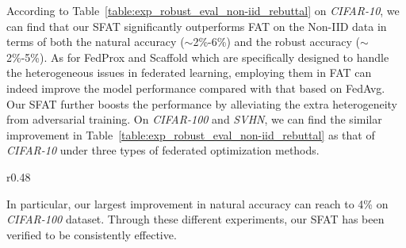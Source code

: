 \documentclass{article} %
\theoremstyle{plain}
\theoremstyle{definition}
\theoremstyle{remark}
\begin{document}
According to Table~\ref{table:exp_robust_eval_non-iid_rebuttal} on \textit{CIFAR-10}, we can find that our SFAT significantly outperforms FAT on the Non-IID data in terms of both the natural accuracy ($\sim$2\%-6\%) and the robust accuracy ($\sim$2\%-5\%). As for FedProx and Scaffold which are specifically designed to handle the heterogeneous issues in federated learning, employing them in FAT can indeed improve the model performance compared with that based on FedAvg. Our SFAT further boosts the performance by alleviating the extra heterogeneity from adversarial training. On \textit{CIFAR-100} and \textit{SVHN}, we can find the similar improvement in Table~\ref{table:exp_robust_eval_non-iid_rebuttal} as that of \textit{CIFAR-10} under three types of federated optimization methods. 
\iffalse
\begin{wraptable}{r}{0.48\linewidth}
\vspace{3mm}
\centering
\caption{Performance on Non-IID settings using a real-world large-scale dataset \textit{CelebA}.}
\scriptsize
\renewcommand\arraystretch{0.8}
\label{table:exp_robust_eval_non-iid_celeba}
\end{wraptable}
In particular, our largest improvement in natural accuracy can reach to 4\% on \textit{CIFAR-100} dataset. Through these different experiments, our SFAT has been verified to be consistently effective.
\end{document}
